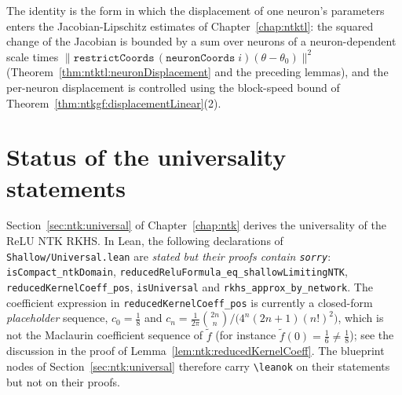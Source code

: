 The identity is the form in which the displacement of one neuron's parameters enters the Jacobian-Lipschitz estimates of Chapter~\ref{chap:ntktl}: the squared change of the Jacobian is bounded by a sum over neurons of a neuron-dependent scale times $\|\texttt{restrictCoords}\,(\texttt{neuronCoords}\;i)(\theta-\theta_0)\|^2$ (Theorem~\ref{thm:ntktl:neuronDisplacement} and the preceding lemmas), and the per-neuron displacement is controlled using the block-speed bound of Theorem~\ref{thm:ntkgf:displacementLinear}(2).


\section{Status of the universality statements}\label{sec:ntkhelp:universal}

Section~\ref{sec:ntk:universal} of Chapter~\ref{chap:ntk} derives the universality of the ReLU NTK RKHS. In Lean, the following declarations of \texttt{Shallow/Universal.lean} are \emph{stated but their proofs contain \texttt{sorry}}: \texttt{isCompact\_ntkDomain}, \texttt{reducedReluFormula\_eq\_shallowLimitingNTK}, \texttt{reducedKernelCoeff\_pos}, \texttt{isUniversal} and \texttt{rkhs\_approx\_by\_network}. The coefficient expression in \texttt{reducedKernelCoeff\_pos} is currently a closed-form \emph{placeholder} sequence, $c_0=\frac18$ and $c_n=\frac1{2\pi}\binom{2n}{n}\big/\bigl(4^n(2n+1)(n!)^2\bigr)$, which is not the Maclaurin coefficient sequence of $\tilde f$ (for instance $\tilde f(0)=\frac16\ne\frac18$); see the discussion in the proof of Lemma~\ref{lem:ntk:reducedKernelCoeff}. The blueprint nodes of Section~\ref{sec:ntk:universal} therefore carry \texttt{\textbackslash leanok} on their statements but not on their proofs.
